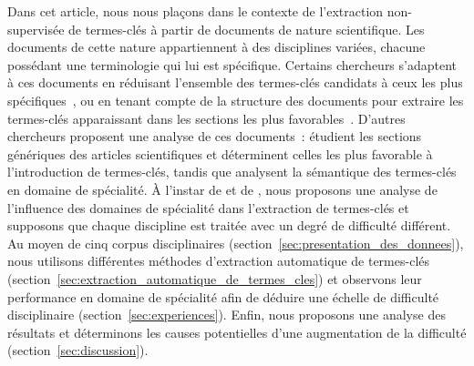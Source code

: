   Dans cet article, nous nous plaçons dans le contexte de l'extraction
  non-supervisée de termes-clés à partir de documents de nature scientifique.
  Les documents de cette nature appartiennent à des disciplines variées, chacune
  possédant une terminologie qui lui est spécifique. Certains chercheurs
  s'adaptent à ces documents en réduisant l'ensemble des termes-clés candidats à
  ceux les plus spécifiques~\cite{kim2009termextraction}, ou en tenant compte de
  la structure des documents pour extraire les termes-clés apparaissant dans les
  sections les plus favorables~\cite{hofmann2009impactofdocumentstructure}.
  D'autres chercheurs proposent une analyse de ces documents~:
   étudient les sections génériques des
  articles scientifiques et déterminent celles les plus favorable à
  l'introduction de termes-clés, tandis que
   analysent la sémantique des
  termes-clés en domaine de spécialité. À l'instar de
   et de
  ,
  nous proposons une analyse de l'influence des domaines de spécialité dans
  l'extraction de termes-clés et supposons que chaque discipline est traitée
  avec un degré de difficulté différent. Au moyen de cinq corpus disciplinaires
  (section~\ref{sec:presentation_des_donnees}), nous utilisons différentes
  méthodes d'extraction automatique de termes-clés
  (section~\ref{sec:extraction_automatique_de_termes_cles}) et observons leur
  performance en domaine de spécialité afin de déduire une échelle de difficulté
  disciplinaire (section~\ref{sec:experiences}). Enfin, nous proposons une
  analyse des résultats et déterminons les causes potentielles d'une
  augmentation de la difficulté (section~\ref{sec:discussion}).

%

